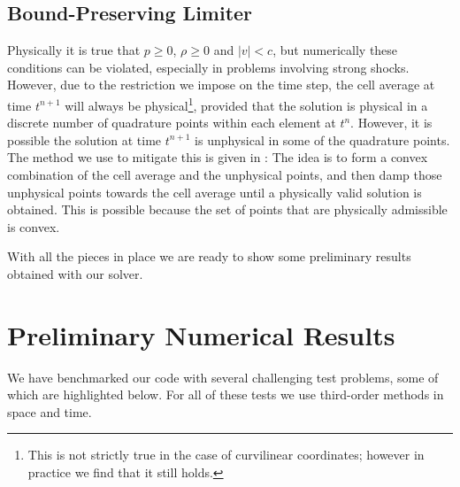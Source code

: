 \documentclass[letterpaper]{jpconf}
\begin{document}
\subsection{Bound-Preserving Limiter}
Physically it is true that $p\geq0$, $\rho\geq0$ and $\left|v\right|<c$, but numerically these conditions can be violated, especially in problems involving strong shocks. However, due to the restriction we impose on the time step, the cell average at time $t^{n+1}$ will always be physical\footnote{This is not strictly true in the case of curvilinear coordinates; however in practice we find that it still holds.}, provided that the solution is physical in a discrete number of quadrature points within each element at $t^{n}$. However, it is possible the solution at time $t^{n+1}$ is unphysical in some of the quadrature points. The method we use to mitigate this is given in \cite{Qin2016}: The idea is to form a convex combination of the cell average and the unphysical points, and then damp those unphysical points towards the cell average until a physically valid solution is obtained. This is possible because the set of points that are physically admissible is convex.

With all the pieces in place we are ready to show some preliminary results obtained with our solver.

\section{Preliminary Numerical Results}\label{sec.results}
We have benchmarked our code with several challenging test problems, some of which are highlighted below. For all of these tests we use third-order methods in space and time.
\end{document}
